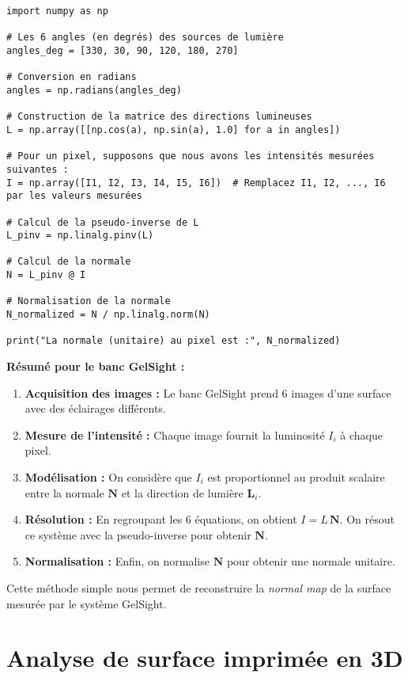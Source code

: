 \begin{lstlisting}
import numpy as np

# Les 6 angles (en degrés) des sources de lumière
angles_deg = [330, 30, 90, 120, 180, 270]

# Conversion en radians
angles = np.radians(angles_deg)

# Construction de la matrice des directions lumineuses
L = np.array([[np.cos(a), np.sin(a), 1.0] for a in angles])

# Pour un pixel, supposons que nous avons les intensités mesurées suivantes :
I = np.array([I1, I2, I3, I4, I5, I6])  # Remplacez I1, I2, ..., I6 par les valeurs mesurées

# Calcul de la pseudo-inverse de L
L_pinv = np.linalg.pinv(L)

# Calcul de la normale
N = L_pinv @ I

# Normalisation de la normale
N_normalized = N / np.linalg.norm(N)

print("La normale (unitaire) au pixel est :", N_normalized)
\end{lstlisting}

\vspace{0.5em}
\textbf{Résumé pour le banc GelSight :}
\begin{enumerate}
  \item \textbf{Acquisition des images :} Le banc GelSight prend 6 images d'une surface avec des éclairages différents.
  \item \textbf{Mesure de l'intensité :} Chaque image fournit la luminosité \(I_i\) à chaque pixel.
  \item \textbf{Modélisation :} On considère que \(I_i\) est proportionnel au produit scalaire entre la normale \(\mathbf{N}\) et la direction de lumière \(\mathbf{L}_i\).
  \item \textbf{Résolution :} En regroupant les 6 équations, on obtient \( I = L\, \mathbf{N} \). On résout ce système avec la pseudo-inverse pour obtenir \(\mathbf{N}\).
  \item \textbf{Normalisation :} Enfin, on normalise \(\mathbf{N}\) pour obtenir une normale unitaire.
\end{enumerate}

Cette méthode simple nous permet de reconstruire la \emph{normal map} de la surface mesurée par le système GelSight.

\section{Analyse de surface imprimée en 3D}
\lipsum[1]
